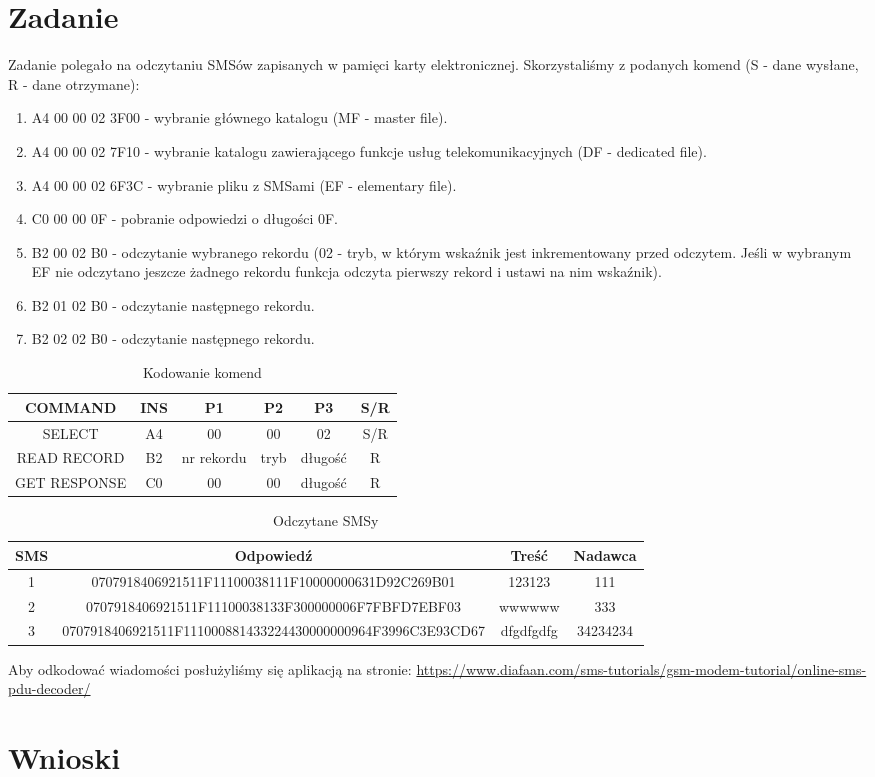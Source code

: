 \documentclass{article}
\begin{document}
\section{Zadanie}
Zadanie polegało na odczytaniu SMSów zapisanych w pamięci karty elektronicznej. Skorzystaliśmy z podanych komend (S - dane wysłane, R - dane otrzymane):
\begin{enumerate}
\item A4 00 00 02 3F00 - wybranie głównego katalogu (MF - master file).
\item A4 00 00 02 7F10 - wybranie katalogu zawierającego funkcje usług telekomunikacyjnych (DF - dedicated file).
\item A4 00 00 02 6F3C - wybranie pliku z SMSami (EF - elementary file).
\item C0 00 00 0F - pobranie odpowiedzi o długości 0F.
\item B2 00 02 B0 - odczytanie wybranego rekordu (02 - tryb, w którym wskaźnik jest inkrementowany przed odczytem. Jeśli w wybranym EF nie odczytano jeszcze żadnego rekordu funkcja odczyta pierwszy rekord i ustawi na nim wskaźnik).
\item B2 01 02 B0 - odczytanie następnego rekordu.
\item B2 02 02 B0 - odczytanie następnego rekordu.
\end{enumerate}
\begin{table}[ht]
    \centering
    \begin{tabular}{|c|c|c|c|c|c|}
        \hline
        COMMAND & INS & P1 & P2 & P3 & S/R \\
        \hline
        SELECT & A4 & 00 & 00 & 02 & S/R \\
        READ RECORD & B2 & nr rekordu & tryb & długość & R \\
        GET RESPONSE & C0 & 00 & 00 & długość & R \\
        \hline
    \end{tabular}
    \caption{Kodowanie komend}
\end{table}
\newpage
\begin{table}[ht]
    \begin{adjustwidth}{-1in}{-1in}
    \centering
    \begin{tabular}{|c|c|c|c|}
        \hline
        SMS & Odpowiedź & Treść & Nadawca \\
        \hline
        1 & 0707918406921511F11100038111F10000000631D92C269B01 & 123123 & 111 \\
        2 & 0707918406921511F11100038133F300000006F7FBFD7EBF03 & wwwwww & 333 \\
        3 & 0707918406921511F111000881433224430000000964F3996C3E93CD67 & dfgdfgdfg & 34234234 \\
        \hline
    \end{tabular}
    \end{adjustwidth}
    \caption{Odczytane SMSy}
\end{table}
Aby odkodować wiadomości posłużyliśmy się aplikacją na stronie: \url{https://www.diafaan.com/sms-tutorials/gsm-modem-tutorial/online-sms-pdu-decoder/}
\section{Wnioski}


\end{document}
